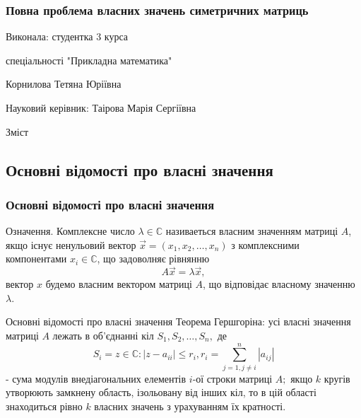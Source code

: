 \documentclass[serif,12pt,unicode]{beamer}
\begin{document}
\begin{frame}
\frametitle{Повна проблема власних значень симетричних матриць}
Виконала: студентка 3 курса

спеціальності "Прикладна математика"

Корнилова Тетяна Юріївна

Науковий керівник:
Таірова Марія Сергіївна
\end{frame}
\begin{frame}{Зміст}
 \tableofcontents
\end{frame}

\begin{frame}
\section{Основні відомості про власні значення}
\frametitle{Основні відомості про власні значення}
Означення.
Комплексне число $\lambda \in \mathbb{C}$ називаеться власним значенням матриці $A$, якщо існує ненульовий вектор $\vec x =(x_1, x_2, \dots, x_n)$ з комплексними компонентами $x_i \in \mathbb{C}$, що задоволняє рівнянню
\begin{equation}\label{eq:1}
A \vec x = \lambda \vec x,
\end{equation}
вектор $x$ будемо власним вектором матриці $A$, що відповідає власному значенню $\lambda$.
\end{frame}
\begin{frame}{Основні відомості про власні значення}
Теорема Гершгоріна: усі власні значення матриці $A$ лежать в об'єднанні кіл $S_1, S_2, \dots, S_n,$ де 
\begin{equation*}S_i = {z \in \mathbb{C}: |z - a_{ii}| \leq r_i, r_i = \sum_{j=1, j \not= i}^n |a_{ij}|}\end{equation*} 
- сума модулів внедіагональних елементів $i$-ої строки матриці $A;$ якщо $k$ кругів утворюють замкнену область, ізольовану від інших кіл, то в цій області знаходиться рівно $k$ власних значень з урахуванням їх кратності.

\end{frame}
\end{document}
